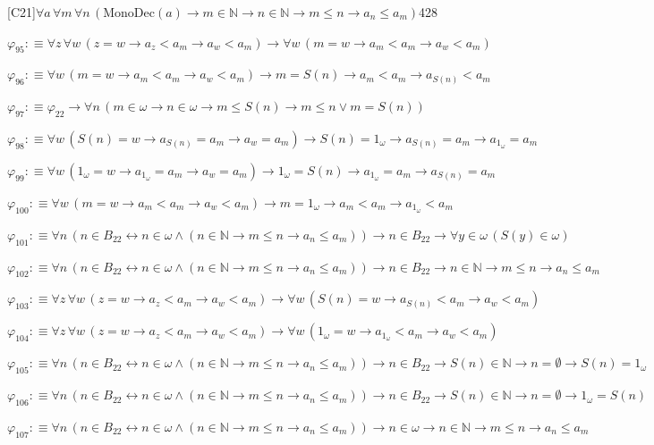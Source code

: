 \begin{fullproof}{[C21]}{$\forall a\,\forall m\,\forall n\,(\mathrm{MonoDec}(a) \to m \in \mathbb{N} \to n \in \mathbb{N} \to m \leq n \to a_{n} \leq a_{m})$}{428}
\begin{abbrevlist}
\item $\varphi_{95} :\equiv \forall z\,\forall w\,(z = w \to a_{z} < a_{m} \to a_{w} < a_{m}) \to \forall w\,(m = w \to a_{m} < a_{m} \to a_{w} < a_{m})$
\item $\varphi_{96} :\equiv \forall w\,(m = w \to a_{m} < a_{m} \to a_{w} < a_{m}) \to m = S(n) \to a_{m} < a_{m} \to a_{S(n)} < a_{m}$
\item $\varphi_{97} :\equiv \varphi_{22} \to \forall n\,(m \in \omega \to n \in \omega \to m \leq S(n) \to m \leq n \lor m = S(n))$
\item $\varphi_{98} :\equiv \forall w\,(S(n) = w \to a_{S(n)} = a_{m} \to a_{w} = a_{m}) \to S(n) = 1_{\omega} \to a_{S(n)} = a_{m} \to a_{1_{\omega}} = a_{m}$
\item $\varphi_{99} :\equiv \forall w\,(1_{\omega} = w \to a_{1_{\omega}} = a_{m} \to a_{w} = a_{m}) \to 1_{\omega} = S(n) \to a_{1_{\omega}} = a_{m} \to a_{S(n)} = a_{m}$
\item $\varphi_{100} :\equiv \forall w\,(m = w \to a_{m} < a_{m} \to a_{w} < a_{m}) \to m = 1_{\omega} \to a_{m} < a_{m} \to a_{1_{\omega}} < a_{m}$
\item $\varphi_{101} :\equiv \forall n\,(n \in B_{22} \leftrightarrow n \in \omega \land (n \in \mathbb{N} \to m \leq n \to a_{n} \leq a_{m})) \to n \in B_{22} \to \forall y \in \omega\,(S(y) \in \omega)$
\item $\varphi_{102} :\equiv \forall n\,(n \in B_{22} \leftrightarrow n \in \omega \land (n \in \mathbb{N} \to m \leq n \to a_{n} \leq a_{m})) \to n \in B_{22} \to n \in \mathbb{N} \to m \leq n \to a_{n} \leq a_{m}$
\item $\varphi_{103} :\equiv \forall z\,\forall w\,(z = w \to a_{z} < a_{m} \to a_{w} < a_{m}) \to \forall w\,(S(n) = w \to a_{S(n)} < a_{m} \to a_{w} < a_{m})$
\item $\varphi_{104} :\equiv \forall z\,\forall w\,(z = w \to a_{z} < a_{m} \to a_{w} < a_{m}) \to \forall w\,(1_{\omega} = w \to a_{1_{\omega}} < a_{m} \to a_{w} < a_{m})$
\item $\varphi_{105} :\equiv \forall n\,(n \in B_{22} \leftrightarrow n \in \omega \land (n \in \mathbb{N} \to m \leq n \to a_{n} \leq a_{m})) \to n \in B_{22} \to S(n) \in \mathbb{N} \to n = \emptyset \to S(n) = 1_{\omega}$
\item $\varphi_{106} :\equiv \forall n\,(n \in B_{22} \leftrightarrow n \in \omega \land (n \in \mathbb{N} \to m \leq n \to a_{n} \leq a_{m})) \to n \in B_{22} \to S(n) \in \mathbb{N} \to n = \emptyset \to 1_{\omega} = S(n)$
\item $\varphi_{107} :\equiv \forall n\,(n \in B_{22} \leftrightarrow n \in \omega \land (n \in \mathbb{N} \to m \leq n \to a_{n} \leq a_{m})) \to n \in \omega \to n \in \mathbb{N} \to m \leq n \to a_{n} \leq a_{m}$

\end{abbrevlist}
\end{fullproof}
